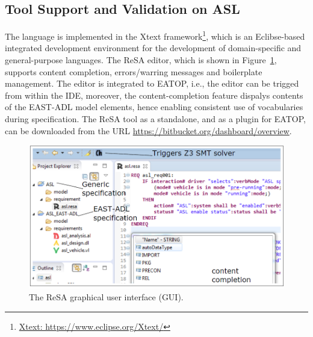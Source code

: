 \subsection*{Tool Support and Validation on ASL}
The language is implemented in the Xtext framework\footnote{\url{Xtext: https://www.eclipse.org/Xtext/}}, which is an Eclibse-based integrated development environment for the development of domain-specific and general-purpose languages. The ReSA editor, which is shown in Figure~\ref{fig_resagui}, supports content completion, errors/warring messages and boilerplate management. The editor is integrated to EATOP, i.e., the editor can be trigged from within the IDE, moreover, the content-completion feature dispalys contents of the EAST-ADL model elements, hence enabling consistent use of vocabularies during specification. The ReSA tool as a standalone, and as a plugin for EATOP, can be downloaded from the URL {\small \url{https://bitbucket.org/dashboard/overview}}. 
\begin{figure}[h]
	\centering
	\includegraphics[width=0.7\linewidth]{images/resagui}
	\caption{The ReSA graphical user interface (GUI).}
	\label{fig_resagui}
\end{figure}

